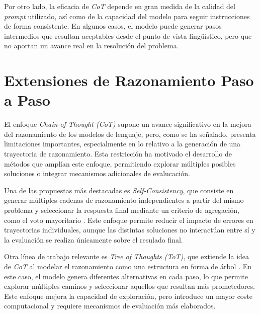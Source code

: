 \documentclass[12pt,a4paper,twoside,openright]{book}
\begin{document}
Por otro lado, la eficacia de \emph{CoT} depende en gran medida de la calidad del \emph{prompt} utilizado, así como de la capacidad del modelo para seguir instrucciones de forma consistente. En algunos casos, el modelo puede generar pasos
intermedios que resultan aceptables desde el punto de vista lingüístico, pero que no aportan un avance real en la resolución del problema.


\section{Extensiones de Razonamiento Paso a Paso}

El enfoque  \emph{Chain-of-Thought (CoT)} supone un avance significativo en la mejora del razonamiento de los modelos de lenguaje, pero, como se ha señalado, presenta limitaciones importantes, especialmente en lo relativo a la
generación de una trayectoria de razonamiento. Esta restricción ha motivado el desarrollo de métodos que amplían este enfoque, permitiendo explorar múltiples posibles soluciones o integrar mecanismos adicionales de evalucación.

Una de las propuestas más destacadas es \emph{Self-Consistency}, que consiste en generar múltiples cadenas de razonamiento independientes a partir del mismo problema y seleccionar la respuesta final mediante un criterio de agregación,
como el voto mayoritario \cite{wang2022self}. Este enfoque permite reducir el impacto de errores en trayectorias individuales, aunque las distintas soluciones no interactúan entre sí y la evaluación se realiza únicamente sobre
el resulado final.

Otra línea de trabajo relevante es \emph{Tree of Thoughts (ToT)}, que extiende la idea de \emph{CoT} al modelar el razonamiento como una estructura en forma de árbol \cite{yao2023tot}. En este caso, el modelo genera diferentes
alternativas en cada paso, lo que permite explorar múltiples caminos y seleccionar aquellos que resultan más prometedores. Este enfoque mejora la capacidad de exploración, pero introduce un mayor coste computacional y requiere mecanismos
de evaluación más elaborados.
\end{document}
